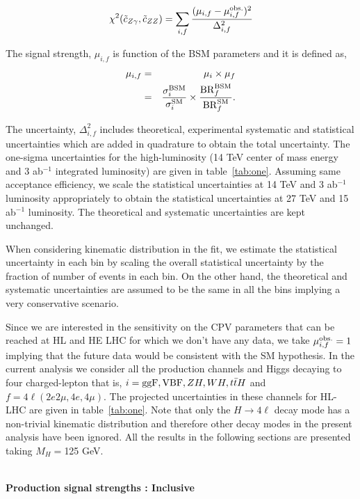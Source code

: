 \begin{equation}
 \chi^2(\tilde c_{Z\gamma},\tilde c_{ZZ}) = \sum_{i,f} \frac{(\mu_{i,f} -\mu_{i,f}^{\rm obs.})^2}{\Delta_{i,f}^2}
\end{equation}
{
The signal strength, $\mu_{i,f}$ is function of the BSM parameters and it is defined as, 
\begin{eqnarray}
 \mu_{i,f} &=& \mu_i \times \mu_f \\
         &=& \frac{\sigma_i^{\rm BSM}}{\sigma_i^{\rm SM}} \times \frac{{\rm BR}_f^{ \rm BSM}}{{\rm BR}_f^{ \rm SM}}.
\end{eqnarray}

The uncertainty, $\Delta_{i,f}^2$ includes theoretical, experimental systematic and statistical uncertainties which 
are added in quadrature to obtain the total uncertainty.
The one-sigma uncertainties for the high-luminosity (14 TeV center of mass energy and 3 ab$^{-1}$ integrated luminosity) are given in table~\ref{tab:one}. 
Assuming same acceptance efficiency, we scale the statistical uncertainties at 14 TeV and 3 ab$^{-1}$ luminosity appropriately 
to obtain the statistical uncertainties at 27 TeV and 15 ab$^{-1}$ 
luminosity. The theoretical and systematic uncertainties are kept unchanged.

When considering kinematic distribution in the fit, we estimate the statistical uncertainty in each bin by scaling 
the overall statistical uncertainty by the fraction of number 
of events in each bin. On the other hand, the theoretical 
and systematic uncertainties are assumed to be the same in all the bins implying 
a very conservative scenario.


Since we are interested in the sensitivity on the CPV parameters that can be reached at HL and HE LHC for which we don't have any data, we take 
$\mu_{i,f}^{\rm obs.}=1$ implying that the future data would be consistent with the SM hypothesis. In the current analysis we consider all the production channels and Higgs decaying to four charged-lepton that is, $i={{\rm ggF, VBF}, ZH, WH, t{\bar t}H}$ and $f=4\ell (2e2\mu, 4e, 4\mu)$. The projected uncertainties in these channels for HL-LHC are given in table~\ref{tab:one}. Note that only the $H\to 4\ell $ decay mode has a non-trivial kinematic distribution and therefore other decay modes in the present analysis have been ignored.
All the results in the following sections are presented taking $M_H=$125 GeV.
}\\

{\bf Production signal strengths : Inclusive} \\


